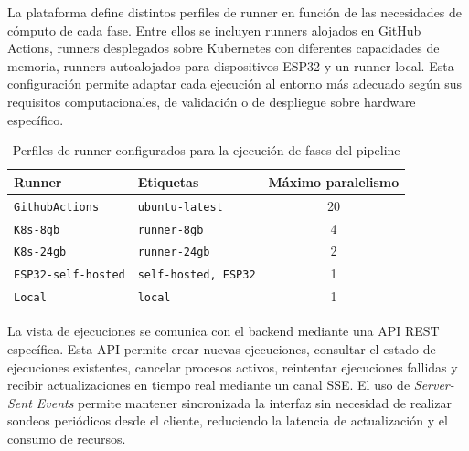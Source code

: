 La plataforma define distintos perfiles de runner en función de las necesidades de cómputo de cada fase. Entre ellos se incluyen runners alojados en GitHub Actions, runners desplegados sobre Kubernetes con diferentes capacidades de memoria, runners autoalojados para dispositivos ESP32 y un runner local. Esta configuración permite adaptar cada ejecución al entorno más adecuado según sus requisitos computacionales, de validación o de despliegue sobre hardware específico.

\begin{table}[H]
\centering
\renewcommand{\arraystretch}{1.3}
\begin{tabular}{|l|l|c|}
\hline
\textbf{Runner} & \textbf{Etiquetas} & \textbf{Máximo paralelismo} \\ \hline
\texttt{GithubActions} & \texttt{ubuntu-latest} & 20 \\ \hline
\texttt{K8s-8gb} & \texttt{runner-8gb} & 4 \\ \hline
\texttt{K8s-24gb} & \texttt{runner-24gb} & 2 \\ \hline
\texttt{ESP32-self-hosted} & \texttt{self-hosted, ESP32} & 1 \\ \hline
\texttt{Local} & \texttt{local} & 1 \\ \hline
\end{tabular}
\caption{Perfiles de runner configurados para la ejecución de fases del pipeline}
\label{tab:runners-ejecuciones}
\end{table}

La vista de ejecuciones se comunica con el backend mediante una API REST específica. Esta API permite crear nuevas ejecuciones, consultar el estado de ejecuciones existentes, cancelar procesos activos, reintentar ejecuciones fallidas y recibir actualizaciones en tiempo real mediante un canal SSE. El uso de \textit{Server-Sent Events} permite mantener sincronizada la interfaz sin necesidad de realizar sondeos periódicos desde el cliente, reduciendo la latencia de actualización y el consumo de recursos.

